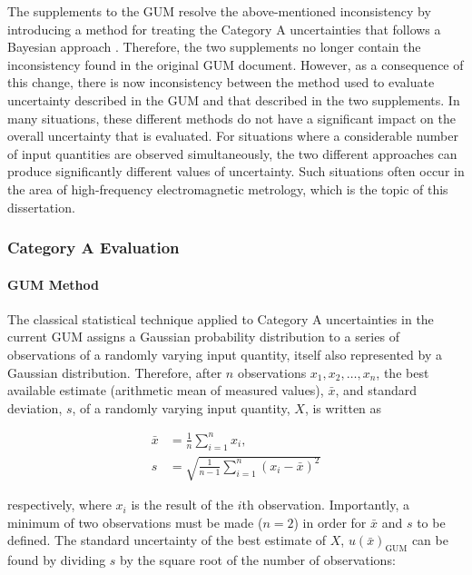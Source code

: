 \documentclass[../thesis/thesis.tex]{subfiles}
\begin{document}
\begin{refsection}
The supplements to the GUM \cite{GUM_S1,GUM_S2} resolve the above-mentioned inconsistency by introducing a method for treating the Category A uncertainties that follows a Bayesian approach \cite{Elster_2007}. Therefore, the two supplements no longer contain the inconsistency found in the original GUM document. However, as a consequence of this change, there is now inconsistency between the method used to evaluate uncertainty described in the GUM and that described in the two supplements. In many situations, these different methods do not have a significant impact on the overall uncertainty that is evaluated. For situations where a considerable number of input quantities are observed simultaneously, the two different approaches can produce significantly different values of uncertainty. Such situations often occur in the area of high-frequency electromagnetic metrology, which is the topic of this dissertation.

\subsubsection{Category A Evaluation}

\paragraph{GUM Method}

The classical statistical technique \cite{Neyman_1937} applied to Category A uncertainties in the current GUM assigns a Gaussian probability distribution to a series of observations of a randomly varying input quantity, itself also represented by a Gaussian distribution. Therefore, after $n$ observations $x_1,x_2,\dots,x_n$, the best available estimate (arithmetic mean of measured values), $\bar{x}$, and standard deviation, $s$, of a randomly varying input quantity, $X$, is written as

\begin{align}
\bar{x} & =\frac{1}{n}\sum_{i=1}^{n}x_i,\\
s & =\sqrt{\frac{1}{n-1}\sum_{i=1}^{n}(x_i-\bar{x})^2}
\end{align}

respectively, where $x_i$ is the result of the $i$th observation. Importantly, a minimum of two observations must be made ($n=2$) in order for $\bar{x}$ and $s$ to be defined. The standard uncertainty of the best estimate of $X$, $u(\bar{x})_{\textrm{GUM}}$ can be found by dividing $s$ by the square root of the number of observations:


\end{refsection}
\end{document}
